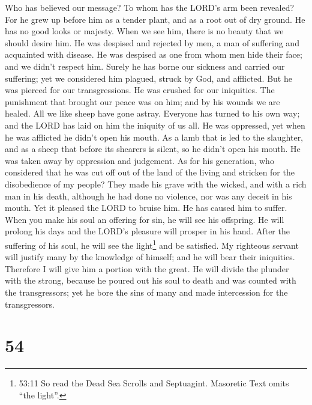  Who has believed our message? To whom has the LORD's arm
been revealed?  For he grew up before him as a tender plant,
and as a root out of dry ground. He has no good looks or majesty. When
we see him, there is no beauty that we should desire him. 
He was despised and rejected by men, a man of suffering and acquainted
with disease. He was despised as one from whom men hide their face; and
we didn't respect him.  Surely he has borne our sickness and
carried our suffering; yet we considered him plagued, struck by God, and
afflicted.  But he was pierced for our transgressions. He
was crushed for our iniquities. The punishment that brought our peace
was on him; and by his wounds we are healed.  All we like
sheep have gone astray. Everyone has turned to his own way; and the LORD
has laid on him the iniquity of us all.  He was oppressed,
yet when he was afflicted he didn't open his mouth. As a lamb that is
led to the slaughter, and as a sheep that before its shearers is silent,
so he didn't open his mouth.  He was taken away by
oppression and judgement. As for his generation, who considered that he
was cut off out of the land of the living and stricken for the
disobedience of my people?  They made his grave with the
wicked, and with a rich man in his death, although he had done no
violence, nor was any deceit in his mouth.  Yet it pleased
the LORD to bruise him. He has caused him to suffer. When you make his
soul an offering for sin, he will see his offspring. He will prolong his
days and the LORD's pleasure will prosper in his hand. 
After the suffering of his soul, he will see the light\footnote{53:11 So
  read the Dead Sea Scrolls and Septuagint. Masoretic Text omits ``the
  light''.} and be satisfied. My righteous servant will justify many by
the knowledge of himself; and he will bear their iniquities.
 Therefore I will give him a portion with the great. He
will divide the plunder with the strong, because he poured out his soul
to death and was counted with the transgressors; yet he bore the sins of
many and made intercession for the transgressors.

\hypertarget{section-51}{%
\section{54}\label{section-51}}

